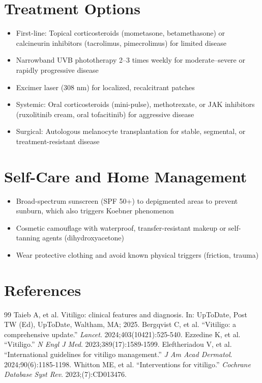 \section*{Treatment Options}
\begin{itemize}
  \item First-line: Topical corticosteroids (mometasone, betamethasone) or calcineurin inhibitors (tacrolimus, pimecrolimus) for limited disease
  \item Narrowband UVB phototherapy 2--3 times weekly for moderate--severe or rapidly progressive disease
  \item Excimer laser (308 nm) for localized, recalcitrant patches
  \item Systemic: Oral corticosteroids (mini-pulse), methotrexate, or JAK inhibitors (ruxolitinib cream, oral tofacitinib) for aggressive disease
  \item Surgical: Autologous melanocyte transplantation for stable, segmental, or treatment-resistant disease
\end{itemize}

\section*{Self-Care and Home Management}
\begin{itemize}
  \item Broad-spectrum sunscreen (SPF 50+) to depigmented areas to prevent sunburn, which also triggers Koebner phenomenon
  \item Cosmetic camouflage with waterproof, transfer-resistant makeup or self-tanning agents (dihydroxyacetone)
  \item Wear protective clothing and avoid known physical triggers (friction, trauma)
\end{itemize}

\section*{References}
\begin{thebibliography}{99}
 Taieb A, et al. Vitiligo: clinical features and diagnosis. In: UpToDate, Post TW (Ed), UpToDate, Waltham, MA; 2025.
 Bergqvist C, et al. ``Vitiligo: a comprehensive update.'' \emph{Lancet}. 2024;403(10421):525-540.
 Ezzedine K, et al. ``Vitiligo.'' \emph{N Engl J Med}. 2023;389(17):1589-1599.
 Eleftheriadou V, et al. ``International guidelines for vitiligo management.'' \emph{J Am Acad Dermatol}. 2024;90(6):1185-1198.
 Whitton ME, et al. ``Interventions for vitiligo.'' \emph{Cochrane Database Syst Rev}. 2023;(7):CD013476.
\end{thebibliography}
